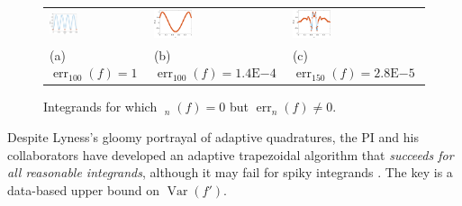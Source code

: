 \documentclass[11pt]{NSFamsart}
\DeclareMathOperator{\err}{err}
\DeclareMathOperator{\herr}{\widehat{\err}}
\DeclareMathOperator{\Var}{Var}
\begin{document}
\begin{figure}[h]
	\begin{tabular}{>{\centering}m{}@{\quad}>{\centering}m{}@{\quad}>{\centering}m{}}
		\includegraphics[width=0.3\textwidth]{ProgramsImages/SpikyFoolTrapezoidalcolor.eps} &
		\includegraphics[width=0.3\textwidth]{ProgramsImages/FlukyFoolTrapezoidalcolor.eps} &
		\includegraphics[width=0.3\textwidth]{ProgramsImages/FlukyFoolIntegralcolor.eps} 
		\tabularnewline
		(a) $\err_{100}(f) = 1 $ &
		(b) $\err_{100}(f) =  1.4\text{E}{-4}$ &
		(c) $\err_{150}(f) =  2.8\text{E}{-5}$
		\end{tabular}
	\caption{Integrands for which $\herr_n(f) = 0$ but 
	$\err_n(f) \ne 0$. \label{quadfailfig}}
\end{figure}

Despite Lyness's gloomy portrayal of adaptive quadratures, the PI and his collaborators have 
developed an adaptive trapezoidal algorithm that \emph{succeeds for all reasonable integrands}, 
although 
it 
may fail for spiky integrands \cite{HicEtal14a,HicRazYun15a}. The key is a 
data-based upper bound on $\Var(f')$.  
\end{document}

